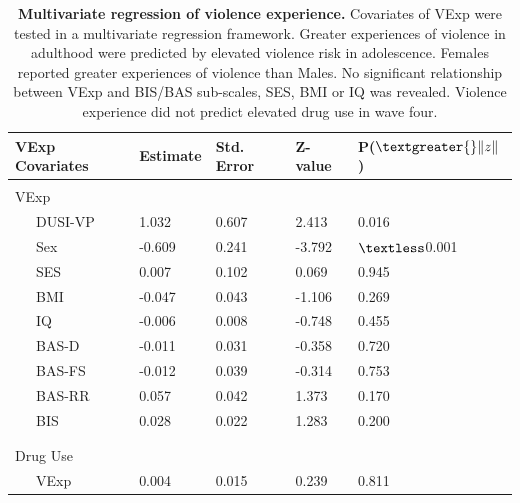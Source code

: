 \documentclass[utf8]{article}
\begin{document}
\begin{table}[h!]
\begin{tabular}{lllll}
VExp Covariates      & Estimate & Std. Error & Z-value & P($\textgreater{}\|z\|$) \\ \hline
                &          &            &         &                          \\
VExp           &          &            &         &                          \\
\ \ \ DUSI-VP         & 1.032    & 0.607      & 2.413   & 0.016                    \\
\ \ \ Sex             & -0.609   & 0.241      & -3.792  & $\textless$0.001                    \\
\ \ \ SES             & 0.007    & 0.102      & 0.069   & 0.945                    \\
\ \ \ BMI             & -0.047   & 0.043      & -1.106  & 0.269                    \\
\ \ \ IQ              & -0.006   & 0.008      & -0.748  & 0.455                    \\
\ \ \ BAS-D           & -0.011   & 0.031      & -0.358  & 0.720                    \\
\ \ \ BAS-FS          & -0.012   & 0.039      & -0.314  & 0.753                    \\
\ \ \ BAS-RR          & 0.057    & 0.042      & 1.373   & 0.170                    \\
\ \ \ BIS             & 0.028    & 0.022      & 1.283   & 0.200                    \\
                &          &            &         &                          \\ \hline \\ 
Drug Use          &          &            &         &                          \\ 
\ \ \ VExp            & 0.004    & 0.015      & 0.239   & 0.811                   
\end{tabular}
\caption{\textbf{Multivariate regression of violence experience.} Covariates of VExp were tested in a multivariate regression framework. Greater experiences of violence in adulthood were predicted by elevated violence risk in adolescence. Females reported greater experiences of violence than Males. No significant relationship between VExp and BIS/BAS sub-scales, SES, BMI or IQ was revealed. Violence experience did not predict elevated drug use in wave four. \label{tab:4}}
\end{table}
\end{document}
